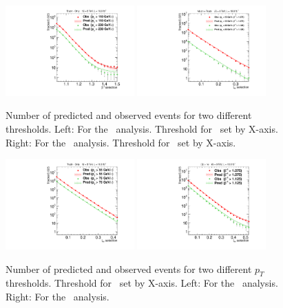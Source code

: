\begin{figure}
\centering
  \includegraphics[clip=true, trim=0.0cm 0cm 2.4cm 0cm, width=0.44\textwidth]{figures/muonly/Prediction_Data8TeV_NPredVsNObs}
  \includegraphics[clip=true, trim=0.0cm 0cm 2.8cm 0cm,width=0.44\textwidth]{figures/tkmu/Prediction_Data8TeV_NPredVsNObs}
  \caption[Number of predicted and observed events for two different thresholds in the \muononly\ and \tktof\ analyses.]
{Number of predicted and observed events for two different thresholds. 
Left: For the \muononly\ analysis. Threshold for \invbeta\ set by X-axis.
Right: For the \tkonly\ analysis. Threshold for \ias\ set by X-axis.}
    \label{fig:PredPt230}
\end{figure}

\begin{figure}
\centering
  \includegraphics[clip=true, trim=0.0cm 0cm 2.8cm 0cm,width=0.44\textwidth]{figures/tkonly/Prediction_Data8TeV_NPredVsNObs}
  \includegraphics[clip=true, trim=0.0cm 0cm 2.8cm 0cm, width=0.44\textwidth]{figures/multi/Prediction_Data8TeV_NPredVsNObs}
  \caption[Number of predicted and observed events for two different thresholds in the \tkonly\ and \multi\ analyses.]
{Number of predicted and observed events for two different $p_T$ thresholds. Threshold for \ias\ set by X-axis.
Left: For the \tkonly\ analysis. Right: For the \multi\ analysis.}
    \label{fig:PredMF}
\end{figure}

